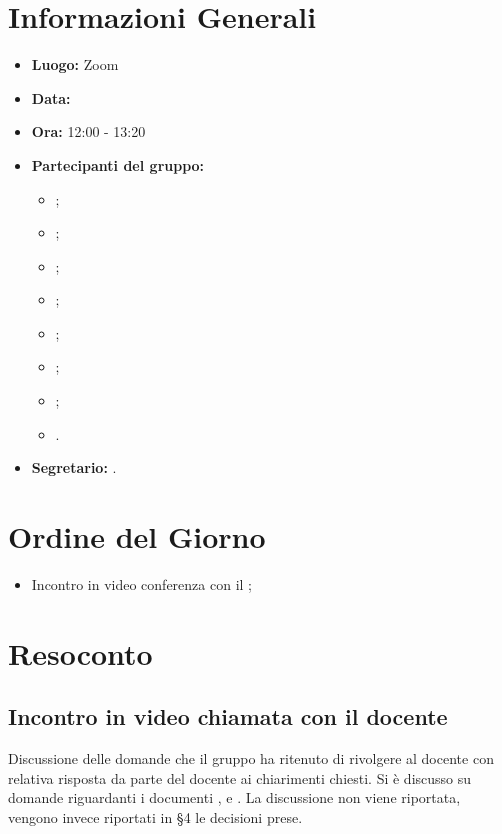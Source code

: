 \section{Informazioni Generali}
\begin{itemize}
	\item \textbf{Luogo:} Zoom
	\item \textbf{Data:} \Data
	\item \textbf{Ora:} 12:00 - 13:20
	\item \textbf{Partecipanti del gruppo:}
	\begin{itemize}
		\item \AT{};
		\item \BR{};  
		\item \CE{}; 
		\item \DF{};
		\item \LD{};
		\item \MC{};
		\item \PF{};
		\item \SE{}.
	\end{itemize} 
	\item \textbf{Segretario:} \BR{}.
\end{itemize}

\section{Ordine del Giorno}
\begin{itemize}
	\item Incontro in video conferenza con il \VT{};
\end{itemize}

\section{Resoconto}

\subsection{Incontro in video chiamata con il docente}
Discussione delle domande che il gruppo ha ritenuto di rivolgere al docente con relativa risposta da parte del docente ai chiarimenti chiesti. Si è discusso su domande riguardanti i documenti \PdP{}, \NdP{} e \PdQ{}.
La discussione non viene riportata, vengono invece riportati in §4 le decisioni prese.

\clearpage